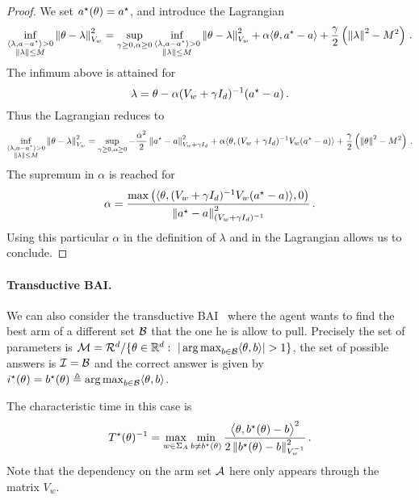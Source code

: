 \begin{proof}
We set $a^\star(\theta) = a^\star$, and introduce the Lagrangian
\[
 \inf_{\substack{\langle \lambda,a-a^\star \rangle>0\\ \left\lVert\lambda\right\rVert\leq M}} \left\lVert\theta -\lambda \right\rVert_{V_w}^2 = \sup_{\gamma\geq 0, \alpha\geq 0} \inf_{\substack{\langle \lambda,a-a^\star\rangle>0\\ \left\lVert\lambda\right\rVert\leq M}} \left\lVert\theta -\lambda \right\rVert_{V_w}^2 +\alpha \langle \theta, a^\star-a\rangle + \frac{\gamma}{2}\left(\left\lVert\lambda\right\rVert^2-M^2 \right)\,.
\]
The infimum above is attained for
\[
\lambda = \theta - \alpha (V_w + \gamma I_d)^{-1}(a^\star-a)\,.
\]
Thus the Lagrangian reduces to
\[
\inf_{\substack{\langle \lambda,a-a^\star \rangle>0\\ \left\lVert\lambda\right\rVert\leq M}} \left\lVert\theta -\lambda \right\rVert_{V_w}^2 = \sup_{\gamma\geq 0, \alpha\geq 0}
-\frac{\alpha^2}{2} \left\lVert a^\star-a\right\rVert^2_{V_w+\gamma I_d} + \alpha \langle \theta, (V_w+\gamma I_d)^{-1}V_w (a^\star-a)\rangle +\frac{\gamma}{2}\left(\left\lVert\theta\right\rVert^2-M^2 \right)\,.
\]
The supremum in $\alpha$ is reached for
\[
\alpha =\frac{\max\left(\langle \theta, (V_w+\gamma I_d)^{-1} V_w (a^\star-a)\rangle,0\right)}{\left\lVert a^\star-a\right\rVert^2_{(V_w+\gamma I_d)^{-1}}}\,.
\]
Using this particular $\alpha$ in the definition of $\lambda$ and in the Lagrangian allows us to conclude.
\end{proof}

\paragraph{Transductive BAI.}\label{sec:lgc.formulation.examples.transductive}
We can also consider the transductive BAI~\citep{fiez2019transductive} where the agent wants to find the best arm of a different set $\mathcal{B}$ that the one he is allow to pull. Precisely the set of parameters is $\cM=\cR^d/\{\theta\in\R^d:\  |\argmax_{b\in\cB} \langle\theta,b\rangle|>1\}$, the set of possible answers is $\mathcal{I} = \mathcal{B}$ and the correct answer is given by $i^\star(\theta)=b^\star(\theta)\triangleq \operatorname*{arg\,max}_{b\in\mathcal{B}} \langle\theta,b\rangle$.

The characteristic time in this case is
\[
T^{\star}(\theta)^{-1} = \max_{w\in\Sigma_A} \min_{b\neq b^\star(\theta)} \frac{\big\langle \theta, b^\star(\theta)-b\big\rangle^2}{2 \left\lVert b^\star(\theta)-b\right\rVert_{V_w^{-1}}^2}\,.
\]
Note that the dependency on the arm set $\mathcal{A}$ here only appears through the matrix $V_w$.


